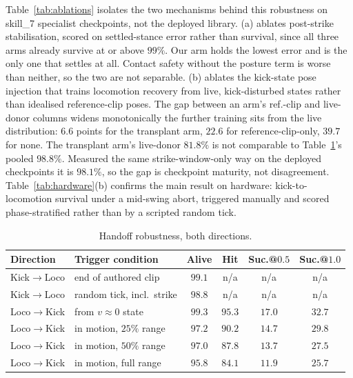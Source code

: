 \documentclass[letterpaper, 10 pt, conference]{ieeeconf}  %
\begin{document}
Table~\ref{tab:ablations} isolates the two mechanisms behind this robustness
on skill\_7 specialist checkpoints, not the deployed library.
(a) ablates post-strike stabilisation, scored on settled-stance error rather
than survival, since all three arms already survive at or above $99\%$. Our
arm holds the lowest error and is the only one that settles at all.
Contact safety without the posture term is worse than neither, so the two are
not separable. (b) ablates the kick-state pose injection that trains
locomotion recovery from live, kick-disturbed states rather than idealised
reference-clip poses. The gap between an arm's ref.-clip and live-donor
columns widens monotonically the further training sits from the live
distribution: $6.6$ points for the transplant arm, $22.6$ for
reference-clip-only, $39.7$ for none. The transplant arm's live-donor $81.8\%$ is not
comparable to Table~\ref{tab:handoff}'s pooled $98.8\%$. Measured the same
strike-window-only way on the deployed checkpoints it is $98.1\%$, so the gap
is checkpoint maturity, not disagreement. Table~\ref{tab:hardware}(b) confirms the main result on
hardware: kick-to-locomotion survival under a mid-swing abort, triggered
manually and scored phase-stratified rather than by a scripted random
tick.

\begin{table}[htbp]
\centering
\caption{Handoff robustness, both directions.}
\label{tab:handoff}
\footnotesize
\setlength{\tabcolsep}{2.5pt}
\begin{tabular}{@{}llcccc@{}}
\toprule
Direction & Trigger condition & Alive & Hit & Suc.@$0.5$ & Suc.@$1.0$ \\
\midrule
Kick$\to$Loco & end of authored clip       & $99.1$  & n/a & n/a & n/a \\
Kick$\to$Loco & random tick, incl.\ strike & $98.8$ & n/a & n/a & n/a \\
\addlinespace[1pt]
Loco$\to$Kick & from $v\!\approx\!0$ state  & $99.3$ & $95.3$ & $17.0$ & $32.7$ \\
Loco$\to$Kick & in motion, $25\%$ range & $97.2$ & $90.2$ & $14.7$ & $29.8$ \\
Loco$\to$Kick & in motion, $50\%$ range & $97.0$ & $87.8$ & $13.7$ & $27.5$ \\
Loco$\to$Kick & in motion, full range & $95.8$ & $84.1$ & $11.9$ & $25.7$ \\
\bottomrule
\end{tabular}
\end{table}
\end{document}
